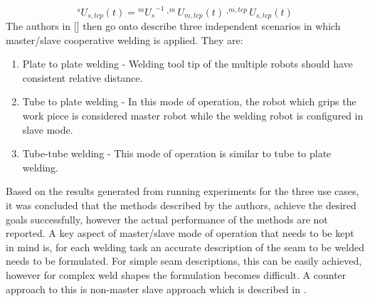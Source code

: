 \begin{equation}
\label{eq14}
^{s}U_{s,tcp}(t) = {^{m}U_{s}}^{-1} \cdot ^{m}U_{m,tcp}(t)\cdot^{m,tcp}U_{s,tcp}(t)
\end{equation}
The authors in [\citet{Zhou2016}] then go onto describe three independent scenarios in which master/slave cooperative welding is applied. They are:
\begin{enumerate}
\item Plate to plate welding - Welding tool tip of the multiple robots should have consistent relative distance.
\item Tube to plate welding - In this mode of operation, the robot which grips the work piece is considered master robot while the welding robot is configured in slave mode.
\item Tube-tube welding - This mode of operation is similar to tube to plate welding.
\end{enumerate}
Based on the results generated from running experiments for the three use cases, it was concluded that the methods described by the authors, achieve the desired goals successfully, however the actual performance of the methods are not reported. A key aspect of master/slave mode of operation that needs to be kept in mind is, for each welding task an accurate description of the seam to be welded needs to be formulated. For simple seam descriptions, this can be easily achieved, however for complex weld shapes the formulation becomes difficult. A counter approach to this is non-master slave approach which is described in \citet{Ouyang2012}.

